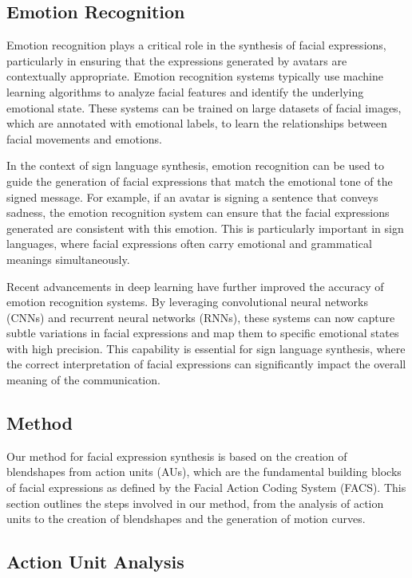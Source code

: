 \documentclass[../../main.tex]{subfiles}
\begin{document}
\subsection{Emotion Recognition}

Emotion recognition plays a critical role in the synthesis of facial expressions, particularly in ensuring that the expressions generated by avatars are contextually appropriate. Emotion recognition systems typically use machine learning algorithms to analyze facial features and identify the underlying emotional state. These systems can be trained on large datasets of facial images, which are annotated with emotional labels, to learn the relationships between facial movements and emotions.

In the context of sign language synthesis, emotion recognition can be used to guide the generation of facial expressions that match the emotional tone of the signed message. For example, if an avatar is signing a sentence that conveys sadness, the emotion recognition system can ensure that the facial expressions generated are consistent with this emotion. This is particularly important in sign languages, where facial expressions often carry emotional and grammatical meanings simultaneously.

Recent advancements in deep learning have further improved the accuracy of emotion recognition systems. By leveraging convolutional neural networks (CNNs) and recurrent neural networks (RNNs), these systems can now capture subtle variations in facial expressions and map them to specific emotional states with high precision. This capability is essential for sign language synthesis, where the correct interpretation of facial expressions can significantly impact the overall meaning of the communication.

\subsection{Method}

Our method for facial expression synthesis is based on the creation of blendshapes from action units (AUs), which are the fundamental building blocks of facial expressions as defined by the Facial Action Coding System (FACS). This section outlines the steps involved in our method, from the analysis of action units to the creation of blendshapes and the generation of motion curves.

\subsection{Action Unit Analysis}
\end{document}
